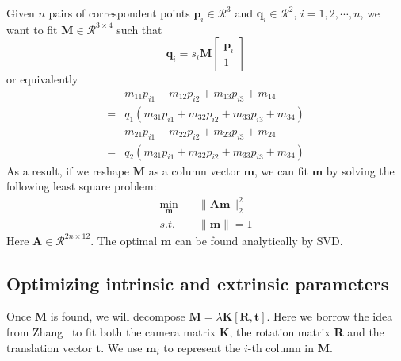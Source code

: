\documentclass[10pt,twocolumn,letterpaper]{article}
\begin{document}
\noindent
Given $n$ pairs of correspondent points $\mathbf{p}_i\in\mathcal{R}^3$ and $\mathbf{q}_i\in\mathcal{R}^2$, $i=1,2,\cdots, n$, we want to fit $\mathbf{M}\in\mathcal{R}^{3\times 4}$ such that
\begin{equation}
\mathbf{q}_i=s_i\mathbf{M}\left[
\begin{array}{c}
\mathbf{p}_i\\
1
\end{array}
\right ]
\end{equation}
or equivalently
\begin{equation}
\begin{split}
&m_{11}p_{i1}+m_{12}p_{i2}+m_{13}p_{i3}+m_{14}\\
=&q_1(m_{31}p_{i1}+m_{32}p_{i2}+m_{33}p_{i3}+m_{34})\\
&m_{21}p_{i1}+m_{22}p_{i2}+m_{23}p_{i3}+m_{24}\\
=&q_2(m_{31}p_{i1}+m_{32}p_{i2}+m_{33}p_{i3}+m_{34})
\end{split}
\end{equation}
As a result, if we reshape $\mathbf{M}$ as a column vector $\mathbf{m}$, we can fit $\mathbf{m}$ by solving the following least square problem:
\begin{equation}
\begin{split}
\min_{\mathbf{m}}&\quad \|\mathbf{Am}\|_2^2\\
s.t.&\quad \|\mathbf{m}\|=1
\end{split}
\end{equation}
Here $\mathbf{A}\in\mathcal{R}^{2n\times 12}$. The optimal $\mathbf{m}$ can be found analytically by SVD.

\subsection{Optimizing intrinsic and extrinsic parameters}

\noindent
Once $\mathbf{M}$ is found, we will decompose $\mathbf{M}=\lambda\mathbf{K[R,t]}$. Here we borrow the idea from Zhang~\cite{zhang2000flexible} to fit both the camera matrix $\mathbf{K}$, the rotation matrix $\mathbf{R}$ and the translation vector $\mathbf{t}$. We use $\mathbf{m}_i$ to represent the $i$-th column in $\mathbf{M}$.\\
\end{document}
